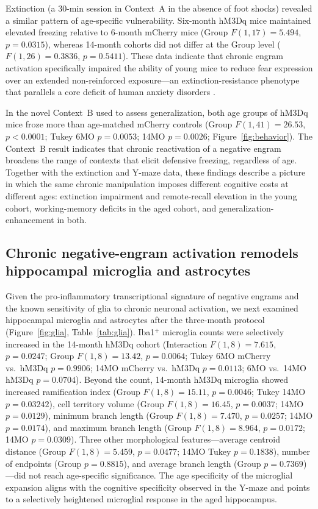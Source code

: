 \documentclass[11pt]{article}
\begin{document}
Extinction (a 30-min session in Context~A in the absence of foot shocks) revealed a similar pattern of age-specific vulnerability. Six-month hM3Dq mice maintained elevated freezing relative to 6-month mCherry mice (Group $F(1,17)=5.494$, $p=0.0315$), whereas 14-month cohorts did not differ at the Group level ($F(1,26)=0.3836$, $p=0.5411$). These data indicate that chronic engram activation specifically impaired the ability of young mice to reduce fear expression over an extended non-reinforced exposure---an extinction-resistance phenotype that parallels a core deficit of human anxiety disorders \citep{maren2013contextual,tovote2015circuits}.

In the novel Context~B used to assess generalization, both age groups of hM3Dq mice froze more than age-matched mCherry controls (Group $F(1,41)=26.53$, $p<0.0001$; Tukey 6MO $p=0.0053$; 14MO $p=0.0026$; Figure~\ref{fig:behavior}). The Context~B result indicates that chronic reactivation of a negative engram broadens the range of contexts that elicit defensive freezing, regardless of age. Together with the extinction and Y-maze data, these findings describe a picture in which the same chronic manipulation imposes different cognitive costs at different ages: extinction impairment and remote-recall elevation in the young cohort, working-memory deficits in the aged cohort, and generalization-enhancement in both.

\subsection{Chronic negative-engram activation remodels hippocampal microglia and astrocytes}

Given the pro-inflammatory transcriptional signature of negative engrams and the known sensitivity of glia to chronic neuronal activation, we next examined hippocampal microglia and astrocytes after the three-month protocol (Figure~\ref{fig:glia}, Table~\ref{tab:glia}). Iba1$^{+}$ microglia counts were selectively increased in the 14-month hM3Dq cohort (Interaction $F(1,8)=7.615$, $p=0.0247$; Group $F(1,8)=13.42$, $p=0.0064$; Tukey 6MO mCherry vs.~hM3Dq $p=0.9906$; 14MO mCherry vs.~hM3Dq $p=0.0113$; 6MO vs.~14MO hM3Dq $p=0.0704$). Beyond the count, 14-month hM3Dq microglia showed increased ramification index (Group $F(1,8)=15.11$, $p=0.0046$; Tukey 14MO $p=0.03242$), cell territory volume (Group $F(1,8)=16.45$, $p=0.0037$; 14MO $p=0.0129$), minimum branch length (Group $F(1,8)=7.470$, $p=0.0257$; 14MO $p=0.0174$), and maximum branch length (Group $F(1,8)=8.964$, $p=0.0172$; 14MO $p=0.0309$). Three other morphological features---average centroid distance (Group $F(1,8)=5.459$, $p=0.0477$; 14MO Tukey $p=0.1838$), number of endpoints (Group $p=0.8815$), and average branch length (Group $p=0.7369$)---did not reach age-specific significance. The age specificity of the microglial expansion aligns with the cognitive specificity observed in the Y-maze and points to a selectively heightened microglial response in the aged hippocampus.
\end{document}
